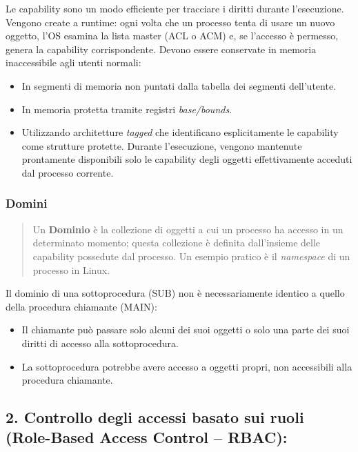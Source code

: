 \documentclass{article}
\begin{document}
Le capability sono un modo efficiente per tracciare i diritti durante l'esecuzione. Vengono create a runtime: ogni volta che un processo tenta di usare un nuovo oggetto, l'OS esamina la lista master (ACL o ACM) e, se l'accesso è permesso, genera la capability corrispondente. Devono essere conservate in memoria inaccessibile agli utenti normali:

\begin{itemize}
    \item In segmenti di memoria non puntati dalla tabella dei segmenti dell'utente.
    \item In memoria protetta tramite registri \textit{base/bounds}.
    \item Utilizzando architetture \textit{tagged} che identificano esplicitamente le capability come strutture protette. Durante l'esecuzione, vengono mantenute prontamente disponibili solo le capability degli oggetti effettivamente acceduti dal processo corrente.
\end{itemize}

\vspace{0.8cm}

\subsubsection*{Domini}

\begin{quote}
    Un \textbf{Dominio} è la collezione di oggetti a cui un processo ha accesso in un determinato momento; questa collezione è definita dall'insieme delle capability possedute dal processo. Un esempio pratico è il \textit{namespace} di un processo in Linux.
\end{quote}

Il dominio di una sottoprocedura (SUB) non è necessariamente identico a quello della procedura chiamante (MAIN):

\begin{itemize}
    \item Il chiamante può passare solo alcuni dei suoi oggetti o solo una parte dei suoi diritti di accesso alla sottoprocedura.
    \item La sottoprocedura potrebbe avere accesso a oggetti propri, non accessibili alla procedura chiamante.
\end{itemize}

\vspace{0.8cm}

\subsection*{2. Controllo degli accessi basato sui ruoli (Role-Based Access Control – RBAC):}
\end{document}

